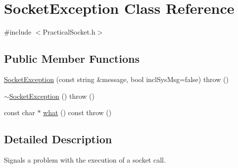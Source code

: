\hypertarget{classSocketException}{\section{Socket\-Exception Class Reference}
\label{classSocketException}
}


{\ttfamily \#include $<$Practical\-Socket.\-h$>$}

\subsection*{Public Member Functions}
\begin{DoxyCompactItemize}
\item 
\hyperlink{classSocketException_abb5bcecd9d9e20868c237ec5a82cf5c3}{Socket\-Exception} (const string \&message, bool incl\-Sys\-Msg=false)  throw ()
\item 
\hyperlink{classSocketException_a659557c899329aea01977c980c4db9b9}{$\sim$\-Socket\-Exception} ()  throw ()
\item 
const char $\ast$ \hyperlink{classSocketException_aba95967e3d7a0496d831d9608f6ead97}{what} () const   throw ()
\end{DoxyCompactItemize}


\subsection{Detailed Description}
Signals a problem with the execution of a socket call. 

